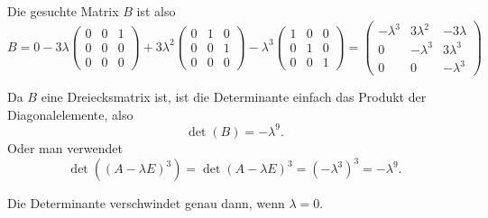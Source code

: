 \begin{loesung}
\begin{teilaufgaben}
Die gesuchte Matrix $B$ ist also
\[
B=0 -3\lambda \begin{pmatrix}
0&0&1\\
0&0&0\\
0&0&0
\end{pmatrix}
+3\lambda^2
\begin{pmatrix}
0&1&0\\
0&0&1\\
0&0&0
\end{pmatrix}
-\lambda^3\begin{pmatrix}1&0&0\\0&1&0\\0&0&1\end{pmatrix}
=\begin{pmatrix}
-\lambda^3& 3\lambda^2&-3\lambda\\
         0&- \lambda^3&3\lambda^3\\
         0&          0&- \lambda^3
\end{pmatrix}
\]
\item
Da $B$ eine Dreiecksmatrix ist, ist die Determinante einfach das Produkt
der Diagonalelemente, also
\[
\det(B)=-\lambda^9.
\]
Oder man verwendet
\[
\det((A-\lambda E)^3)
=
\det(A-\lambda E)^3=(-\lambda^3)^3=-\lambda^9.
\]
\item Die Determinante verschwindet genau dann, wenn $\lambda=0$.
\end{teilaufgaben}
\end{loesung}

